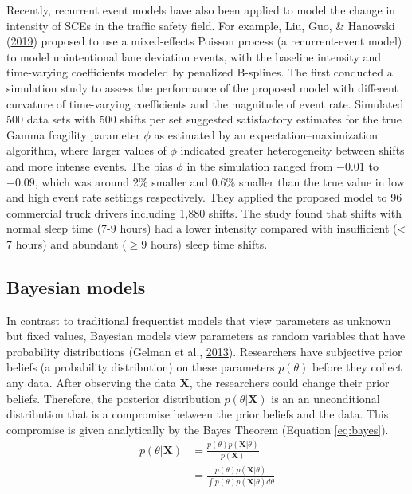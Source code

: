 \documentclass[12pt]{book}
\numberwithin{equation}{chapter}
\begin{document}
Recently, recurrent event models have also been applied to model the change in intensity of SCEs in the traffic safety field. For example, Liu, Guo, \& Hanowski (\protect\hyperlink{ref-liu2019assessing}{2019}) proposed to use a mixed-effects Poisson process (a recurrent-event model) to model unintentional lane deviation events, with the baseline intensity and time-varying coefficients modeled by penalized B-splines. The first conducted a simulation study to assess the performance of the proposed model with different curvature of time-varying coefficients and the magnitude of event rate. Simulated 500 data sets with 500 shifts per set suggested satisfactory estimates for the true Gamma fragility parameter \(\phi\) as estimated by an expectation--maximization algorithm, where larger values of \(\phi\) indicated greater heterogeneity between shifts and more intense events. The bias \(\phi\) in the simulation ranged from \(-0.01\) to \(-0.09\), which was around 2\% smaller and 0.6\% smaller than the true value in low and high event rate settings respectively. They applied the proposed model to 96 commercial truck drivers including 1,880 shifts. The study found that shifts with normal sleep time (7-9 hours) had a lower intensity compared with insufficient (\textless{} 7 hours) and abundant (\(\geq 9\) hours) sleep time shifts.

\hypertarget{bayesian-models}{%
\subsection{Bayesian models}\label{bayesian-models}}

In contrast to traditional frequentist models that view parameters as unknown but fixed values, Bayesian models view parameters as random variables that have probability distributions (Gelman et al., \protect\hyperlink{ref-gelman2013bayesian}{2013}). Researchers have subjective prior beliefs (a probability distribution) on these parameters \(p(\theta)\) before they collect any data. After observing the data \(\mathbf{X}\), the researchers could change their prior beliefs. Therefore, the posterior distribution \(p(\theta | \mathbf{X})\) is an an unconditional distribution that is a compromise between the prior beliefs and the data. This compromise is given analytically by the Bayes Theorem (Equation \eqref{eq:bayes}).
\begin{equation}
\begin{split}
p(\theta | \mathbf{X}) & = \frac{p(\theta)p(\mathbf{X}|\theta)}{p(\mathbf{X})} \\
 & = \frac{p(\theta)p(\mathbf{X}|\theta )}{\int p(\theta)p(\mathbf{X}|\theta)d\theta}
\label{eq:bayes}
\end{split}
\end{equation}
\end{document}
